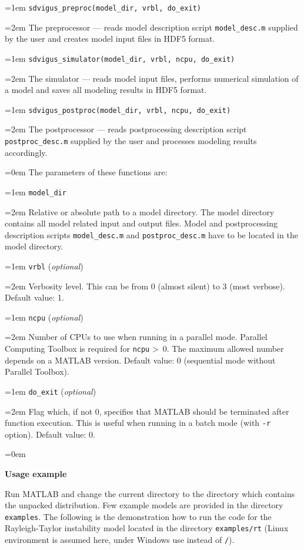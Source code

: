 \documentclass[a4paper,onesided,12pt]{letter}
\begin{document}
\begin{list}{}{\leftmargin=1em}
\leftskip=1em \texttt{sdvigus\_preproc(model\_dir, vrbl, do\_exit)}

\leftskip=2em The preprocessor --- reads model description script \texttt{model\_desc.m} supplied by the user and creates model input files in HDF5 format.

\leftskip=1em \texttt{sdvigus\_simulator(model\_dir, vrbl, ncpu, do\_exit)}

\leftskip=2em The simulator --- reads model input files, performs numerical simulation of a model and saves all modeling results in HDF5 format.

\leftskip=1em \texttt{sdvigus\_postproc(model\_dir, vrbl, ncpu, do\_exit)}

\leftskip=2em The postprocessor --- reads postprocessing description script \texttt{postproc\_desc.m} supplied by the user and processes modeling results accordingly.

\leftskip=0em The parameters of these functions are:

\leftskip=1em \texttt{model\_dir}

\leftskip=2em Relative or absolute path to a model directory. The model directory contains all model related input and output files. Model and postprocessing description scripts \texttt{model\_desc.m} and \texttt{postproc\_desc.m} have to be located in the model directory.

\leftskip=1em \texttt{vrbl} (\textsl{optional})

\leftskip=2em Verbosity level. This can be from 0 (almost silent) to 3 (most verbose). Default value: 1.

\leftskip=1em \texttt{ncpu} (\textsl{optional})

\leftskip=2em Number of CPUs to use when running in a parallel mode. Parallel Computing Toolbox is required for \texttt{ncpu} \textgreater\ 0. The maximum allowed number depends on a MATLAB version. Default value: 0 (sequential mode without Parallel Toolbox).

\leftskip=1em \texttt{do\_exit} (\textsl{optional})

\leftskip=2em Flag which, if not 0, specifies that MATLAB should be terminated after function execution. This is useful when running in a batch mode (with \texttt{-r} option). Default value: 0.

\leftskip=0em

\item \textbf{Usage example}

Run MATLAB and change the current directory to the directory which contains the unpacked distribution. Few example models are provided in the directory \texttt{examples}. The following is the demonstration how to run the code for the Rayleigh-Taylor instability model located in the directory \texttt{examples/rt} (Linux environment is assumed here, under Windows use \texttt{} instead of \texttt{/}).


\end{list}
\end{document}
